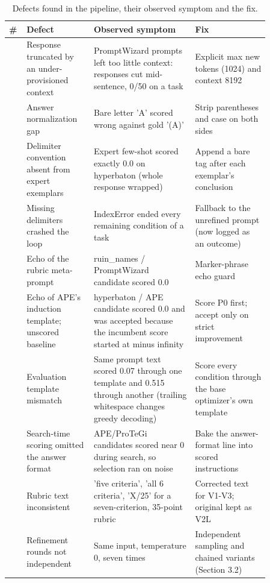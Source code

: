 \documentclass{ieeeaccess}
\begin{document}
\begin{table}[htbp]
\centering
\small
\caption{Defects found in the pipeline, their observed symptom and the fix.}
\begin{tabular}{>{\raggedright\arraybackslash}p{0.034\linewidth}>{\raggedright\arraybackslash}p{0.224\linewidth}>{\raggedright\arraybackslash}p{0.344\linewidth}>{\raggedright\arraybackslash}p{0.258\linewidth}}
\toprule
\textbf{\#} & \textbf{Defect} & \textbf{Observed symptom} & \textbf{Fix} \\
\midrule
1 & Response truncated by an under-provisioned context & PromptWizard prompts left too little context: responses cut mid-sentence, 0/50 on a task & Explicit max new tokens (1024) and context 8192 \\
2 & Answer normalization gap & Bare letter 'A' scored wrong against gold '(A)' & Strip parentheses and case on both sides \\
3 & Delimiter convention absent from expert exemplars & Expert few-shot scored exactly 0.0 on hyperbaton (whole response wrapped) & Append a bare tag after each exemplar's conclusion \\
4 & Missing delimiters crashed the loop & IndexError ended every remaining condition of a task & Fallback to the unrefined prompt (now logged as an outcome) \\
5 & Echo of the rubric meta-prompt & ruin\_\allowbreak{}names / PromptWizard candidate scored 0.0 & Marker-phrase echo guard \\
6 & Echo of APE's induction template; unscored baseline & hyperbaton / APE candidate scored 0.0 and was accepted because the incumbent score started at minus infinity & Score P0 first; accept only on strict improvement \\
7 & Evaluation template mismatch & Same prompt text scored 0.07 through one template and 0.515 through another (trailing whitespace changes greedy decoding) & Score every condition through the base optimizer's own template \\
8 & Search-time scoring omitted the answer format & APE/ProTeGi candidates scored near 0 during search, so selection ran on noise & Bake the answer-format line into scored instructions \\
9 & Rubric text inconsistent & 'five criteria', 'all 6 criteria', 'X/25' for a seven-criterion, 35-point rubric & Corrected text for V1-V3; original kept as V2L \\
10 & Refinement rounds not independent & Same input, temperature 0, seven times & Independent sampling and chained variants (Section 3.2) \\

\end{tabular}
\end{table}
\end{document}
